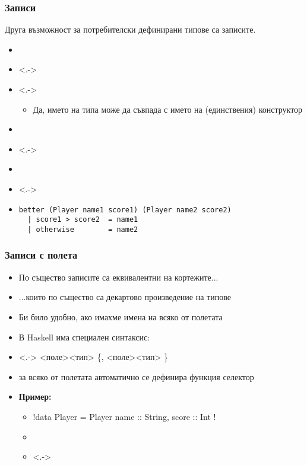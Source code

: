 \documentclass[alsotrans]{beamerswitch}
\begin{document}
\begin{frame}[fragile]
  \frametitle{Записи}
  Друга възможност за потребителски дефинирани типове са \alert{записите}.\\
  \pause
  \begin{itemize}[<+->]
  \item {}
  \item<.-> 
  \item<.-> 
    \begin{itemize}
    \item Да, името на типа може да съвпада с името на (единствения) конструктор
    \end{itemize}
  \item {}
  \item<.-> 
  \item {}
  \item<.-> 
  \item {}
    \begin{lstlisting}
better (Player name1 score1) (Player name2 score2)
  | score1 > score2  = name1
  | otherwise        = name2
    \end{lstlisting}
  \end{itemize}
\end{frame}

\begin{frame}[fragile]
  \frametitle{Записи с полета}
  \begin{itemize}[<+->]
  \item По същество записите са еквивалентни на кортежите...
  \item ...които по същество са декартово произведение на типове
  \item Би било удобно, ако имахме имена на всяко от полетата
  \item В Haskell има специален синтаксис:
  \item<.-> \tta{\{} <поле>\tta{::}<тип> \{, <поле>\tta{::}<тип> \}\tta{\}}
  \item за всяко от полетата автоматично се дефинира функция селектор
  \item \textbf{Пример:}
    \begin{itemize}
    \item \lst!data Player = Player { name :: String, score :: Int }!
    \item {}
    \item<.-> 
    \end{itemize}
  \end{itemize}
\end{frame}
\end{document}
